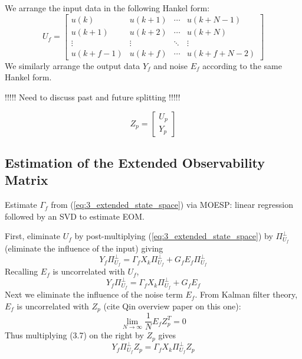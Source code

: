 We arrange the input data in the following Hankel form:
\begin{equation}\label{eq:3_input}
U_f = \begin{bmatrix}
u(k) & u(k+1) & \cdots & u(k+N-1)\\
u(k+1) & u(k+2) & \cdots & u(k+N)\\
\vdots & \vdots & \ddots & \vdots\\
u(k+f-1) & u(k+f) & \cdots & u(k+f+N-2)
\end{bmatrix}
\end{equation}
We similarly arrange the output data $Y_f$ and noise $E_f$ according to the same Hankel form.

!!!!! Need to discuss past and future splitting !!!!!

\begin{equation*}
Z_p = \begin{bmatrix} U_p\\ Y_p\end{bmatrix}
\end{equation*}

\subsection{Estimation of the Extended Observability Matrix}
Estimate $\Gamma_f$ from (\ref{eq:3_extended_state_space}) via MOESP: linear regression followed by an SVD to estimate EOM.

First, eliminate $U_f$ by post-multiplying (\ref{eq:3_extended_state_space}) by $\Pi_{U_f}^\perp$ (eliminate the influence of the input) giving
\begin{equation}
Y_f\Pi_{U_f}^\perp = \Gamma_f X_k\Pi_{U_f}^\perp + G_f E_f\Pi_{U_f}^\perp
\end{equation}
Recalling $E_f$ is uncorrelated with $U_f$, 
\begin{equation}
Y_f\Pi_{U_f}^\perp = \Gamma_f X_k\Pi_{U_f}^\perp + G_f E_f
\end{equation}
Next we eliminate the influence of the noise term $E_f$. From Kalman filter theory, $E_f$ is uncorrelated with $Z_p$ (cite Qin overview paper on this one):
\begin{equation*}
\lim_{N\rightarrow\infty}\frac{1}{N}E_fZ_p^T =0
\end{equation*}
Thus multiplying (3.7) on the right by $Z_p$ gives
\begin{equation}
Y_f\Pi_{U_f}^\perp Z_p = \Gamma_f X_k\Pi_{U_f}^\perp Z_p
\end{equation}



